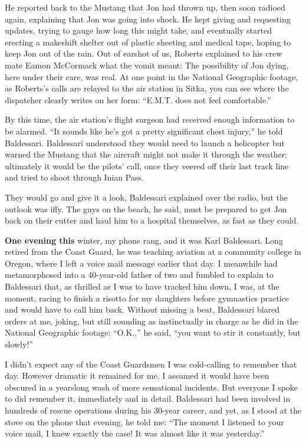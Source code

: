 He reported back to the Mustang that Jon had thrown up, then soon
radioed again, explaining that Jon was going into shock. He kept giving
and requesting updates, trying to gauge how long this might take, and
eventually started erecting a makeshift shelter out of plastic sheeting
and medical tape, hoping to keep Jon out of the rain. Out of earshot of
us, Roberts explained to his crew mate Eamon McCormack what the vomit
meant: The possibility of Jon dying, here under their care, was real. At
one point in the National Geographic footage, as Roberts's calls are
relayed to the air station in Sitka, you can see where the dispatcher
clearly writes on her form: ``E.M.T. does not feel comfortable.''

By this time, the air station's flight surgeon had received enough
information to be alarmed. ``It sounds like he's got a pretty
significant chest injury,'' he told Baldessari. Baldessari understood
they would need to launch a helicopter but warned the Mustang that the
aircraft might not make it through the weather; ultimately it would be
the pilots' call, once they veered off their last track line and tried
to shoot through Inian Pass.

They would go and give it a look, Baldessari explained over the radio,
but the outlook was iffy. The guys on the beach, he said, must be
prepared to get Jon back on their cutter and haul him to a hospital
themselves, as fast as they could.

\textbf{One evening this} winter, my phone rang, and it was Karl
Baldessari. Long retired from the Coast Guard, he was teaching aviation
at a community college in Oregon, where I left a voice mail message
earlier that day. I meanwhile had metamorphosed into a 40-year-old
father of two and fumbled to explain to Baldessari that, as thrilled as
I was to have tracked him down, I was, at the moment, racing to finish a
risotto for my daughters before gymnastics practice and would have to
call him back. Without missing a beat, Baldessari blared orders at me,
joking, but still sounding as instinctually in charge as he did in the
National Geographic footage: ``O.K.,'' he said, ``you want to stir it
constantly, but slowly!''

I didn't expect any of the Coast Guardsmen I was cold-calling to
remember that day. However dramatic it remained for me, I assumed it
would have been obscured in a yearslong wash of more sensational
incidents. But everyone I spoke to did remember it, immediately and in
detail. Baldessari had been involved in hundreds of rescue operations
during his 30-year career, and yet, as I stood at the stove on the phone
that evening, he told me: ``The moment I listened to your voice mail, I
knew exactly the case! It was almost like it was yesterday.''

